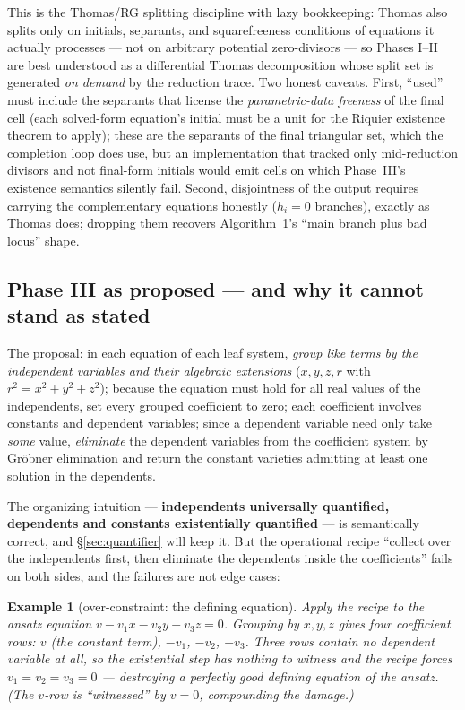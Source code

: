 \documentclass[11pt]{article}
\newtheorem{example}{Example}
\begin{document}
This is the Thomas/RG splitting discipline with lazy bookkeeping: Thomas also
splits only on initials, separants, and squarefreeness conditions of equations
it actually processes --- not on arbitrary potential zero-divisors --- so
Phases I--II are best understood as a differential Thomas decomposition whose
split set is generated \emph{on demand} by the reduction trace. Two honest
caveats. First, ``used'' must include the separants that license the
\emph{parametric-data freeness} of the final cell (each solved-form equation's
initial must be a unit for the Riquier existence theorem to apply); these are
the separants of the final triangular set, which the completion loop does use,
but an implementation that tracked only mid-reduction divisors and not
final-form initials would emit cells on which Phase~III's existence semantics
silently fail. Second, disjointness of the output requires carrying the
complementary equations honestly ($h_i = 0$ branches), exactly as Thomas does;
dropping them recovers Algorithm~1's ``main branch plus bad locus'' shape.

\subsection{Phase III as proposed --- and why it cannot stand as stated}
\label{sec:phase3-naive}

The proposal: in each equation of each leaf system, \emph{group like terms by
the independent variables and their algebraic extensions} ($x,y,z,r$ with
$r^2 = x^2+y^2+z^2$); because the equation must hold for all real values of
the independents, set every grouped coefficient to zero; each coefficient
involves constants and dependent variables; since a dependent variable need
only take \emph{some} value, \emph{eliminate} the dependent variables from the
coefficient system by Gr\"obner elimination and return the constant varieties
admitting at least one solution in the dependents.

The organizing intuition --- \textbf{independents universally quantified,
dependents and constants existentially quantified} --- is semantically
correct, and \S\ref{sec:quantifier} will keep it. But the operational
recipe ``collect over the independents first, then eliminate the dependents
inside the coefficients'' fails on both sides, and the failures are not
edge cases:

\begin{example}[over-constraint: the defining equation]
\label{ex:v-naive}
Apply the recipe to the ansatz equation $v - v_1x - v_2y - v_3z = 0$.
Grouping by $x,y,z$ gives four coefficient rows: $v$ (the constant term),
$-v_1$, $-v_2$, $-v_3$. Three rows contain no dependent variable at all, so
the existential step has nothing to witness and the recipe forces
$v_1 = v_2 = v_3 = 0$ --- destroying a perfectly good \emph{defining}
equation of the ansatz. (The $v$-row is ``witnessed'' by $v=0$, compounding
the damage.)
\end{example}
\end{document}

